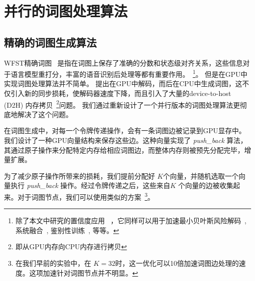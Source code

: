 \section{并行的词图处理算法}
\label{sec:lat-gen}


\subsection{精确的词图生成算法}
WFST精确词图~\cite{povey2012generating} 是指在词图上保存了准确的分数和状态级对齐关系，这些信息对于语言模型重打分，丰富的语音识别后处理等都有重要作用。~\footnote{除了本文中研究的置信度应用~\cite{mangu1999finding} ，它同样可以用于加速最小贝叶斯风险解码~\cite{goel2000minimum},
系统融合~\cite{fiscus1997post}, 鉴别性训练~\cite{povey2005discriminative}, 等等。 }。 %
但是在GPU中实现词图处理算法并不简单。
\cite{kim2014accelerating} 提出在GPU中解码，而后在CPU中生成词图，这不仅引入新的同步损耗，使解码器速度下降，而且引入了大量的device-to-host (D2H) 内存拷贝~\footnote{即从GPU内存向CPU内存进行拷贝}问题。
我们通过重新设计了一个并行版本的词图处理算法\cite{povey2012generating}更彻底地解决了这个问题。


在词图生成中，对每一个令牌传递操作，会有一条词图边被记录到GPU显存中。我们设计了一种GPU向量结构来保存这些边。这种向量实现了  {\em{push\_back}} 算法，其通过原子操作来分配特定内存给相应词图边，而整体内存则被预先分配完毕，增量扩展。

为了减少原子操作所带来的损耗，我们提前分配好 $K$个向量，并随机选取一个向量执行 {\em{push\_back}} 操作。经过令牌传递之后，这些来自$K$ 个向量的边被收集起来。对于词图节点，我们可以使用类似的方案~\footnote{在我们早前的实验中，在 $K=32$时，这一优化可以10倍加速词图边处理的速度。这项加速针对词图节点并不明显。}。


